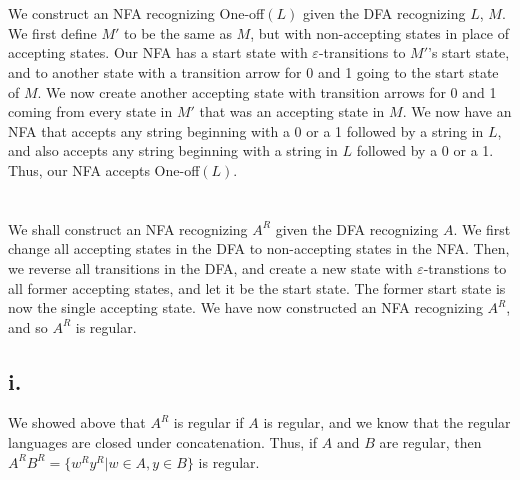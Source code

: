 \documentclass{article}
\begin{document}
\section{} %
We construct an NFA recognizing One-off$(L)$ given the DFA recognizing
$L$, $M$.\\
We first define $M'$ to be the same as $M$, but with non-accepting states in
place of accepting states. Our NFA has a start state with $\varepsilon$-transitions
to $M'$'s start state, and to another state with a transition arrow for 0 and 1
going to the start state of $M$. We now create another accepting state with
transition arrows for 0 and 1 coming from every state in $M'$ that was an
accepting state in $M$.
\newline
\newline
We now have an NFA that accepts any string beginning with a 0 or a 1 followed by
a string in $L$, and also accepts any string beginning with a string in $L$
followed by a 0 or a 1. Thus, our NFA accepts One-off$(L)$.
\section{} %
\subsection{} %
We shall construct an NFA recognizing $A^R$ given the DFA recognizing $A$.
We first change all accepting states in the DFA to non-accepting states in the
NFA. Then, we reverse all transitions in the DFA, and create a new state with
$\varepsilon$-transtions to all former accepting states, and let it be the start
state. The former start state is now the single accepting state. We have now
constructed an NFA recognizing $A^R$, and so $A^R$ is regular.
\subsection{} %
\subsection*{i.} %
We showed above that $A^R$ is regular if $A$ is regular, and we know that the
regular languages are closed under concatenation. Thus, if $A$ and $B$ are
regular, then $A^RB^R=\{w^Ry^R|w\in A,y\in B\}$ is regular.
\end{document}
